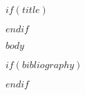 \documentclass[fleqn,10pt]{JLA_article} %
\affiliation{$for(affiliation)$$if(affiliation.correspondence)$Corresponding author $endif$\textsuperscript{$affiliation.num$}\textit{Email: $affiliation.email$ $affiliation.address$$if(affiliation.orcid)$, $affiliation.orcid$$endif$}$sep$\\$endfor$} %
\begin{document}
\flushbottom %

$if(title)$
\maketitle %
$endif$


\thispagestyle{fancy} %

$body$

$if(bibliography)$

$endif$
\end{document}

